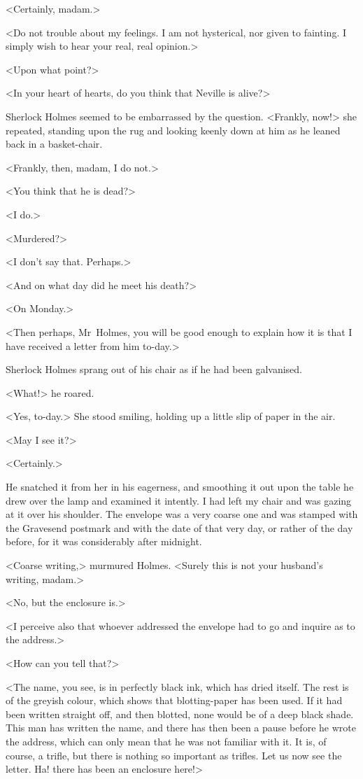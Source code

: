 <Certainly, madam.>

<Do not trouble about my feelings. I am not hysterical, nor given to fainting. I simply wish to hear your real, real opinion.>

<Upon what point?>

<In your heart of hearts, do you think that Neville is alive?>

Sherlock Holmes seemed to be embarrassed by the question. <Frankly, now!> she repeated, standing upon the rug and looking keenly down at him as he leaned back in a basket-chair.

<Frankly, then, madam, I do not.>

<You think that he is dead?>

<I do.>

<Murdered?>

<I don't say that. Perhaps.>

<And on what day did he meet his death?>

<On Monday.>

<Then perhaps, Mr~Holmes, you will be good enough to explain how it is that I have received a letter from him to-day.>

Sherlock Holmes sprang out of his chair as if he had been galvanised.

<What!> he roared.

<Yes, to-day.> She stood smiling, holding up a little slip of paper in the air.

<May I see it?>

<Certainly.>

He snatched it from her in his eagerness, and smoothing it out upon the table he drew over the lamp and examined it intently. I had left my chair and was gazing at it over his shoulder. The envelope was a very coarse one and was stamped with the Gravesend postmark and with the date of that very day, or rather of the day before, for it was considerably after midnight.

<Coarse writing,> murmured Holmes. <Surely this is not your husband's writing, madam.>

<No, but the enclosure is.>

<I perceive also that whoever addressed the envelope had to go and inquire as to the address.>

<How can you tell that?>

<The name, you see, is in perfectly black ink, which has dried itself. The rest is of the greyish colour, which shows that blotting-paper has been used. If it had been written straight off, and then blotted, none would be of a deep black shade. This man has written the name, and there has then been a pause before he wrote the address, which can only mean that he was not familiar with it. It is, of course, a trifle, but there is nothing so important as trifles. Let us now see the letter. Ha! there has been an enclosure here!>

